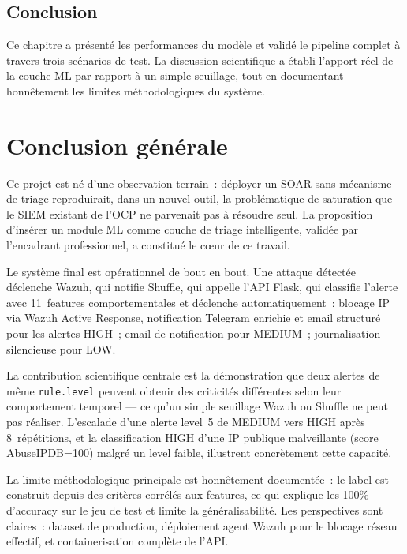 \documentclass[12pt,a4paper]{report}
\begin{document}
\section*{Conclusion}
Ce chapitre a présenté les performances du modèle et validé le
pipeline complet à travers trois scénarios de test. La discussion
scientifique a établi l'apport réel de la couche ML par rapport à
un simple seuillage, tout en documentant honnêtement les limites
méthodologiques du système.

\chapter*{Conclusion générale}

Ce projet est né d'une observation terrain~: déployer un SOAR sans mécanisme de triage reproduirait, dans un nouvel outil, la problématique de saturation que le SIEM existant de l'OCP ne parvenait pas à résoudre seul. La proposition d'insérer un module ML comme couche de triage intelligente, validée par l'encadrant professionnel, a constitué le cœur de ce travail.

Le système final est opérationnel de bout en bout. Une attaque détectée déclenche Wazuh, qui notifie Shuffle, qui appelle l'API Flask, qui classifie l'alerte avec 11~features comportementales et déclenche automatiquement~: blocage IP via Wazuh Active Response, notification Telegram enrichie et email structuré pour les alertes HIGH~; email de notification pour MEDIUM~; journalisation silencieuse pour LOW.

La contribution scientifique centrale est la démonstration que deux alertes de même \texttt{rule.level} peuvent obtenir des criticités différentes selon leur comportement temporel — ce qu'un simple seuillage Wazuh ou Shuffle ne peut pas réaliser. L'escalade d'une alerte level~5 de MEDIUM vers HIGH après 8~répétitions, et la classification HIGH d'une IP publique malveillante (score AbuseIPDB=100) malgré un level faible, illustrent concrètement cette capacité.

La limite méthodologique principale est honnêtement documentée~: le label est construit depuis des critères corrélés aux features, ce qui explique les 100\% d'accuracy sur le jeu de test et limite la généralisabilité. Les perspectives sont claires~: dataset de production, déploiement agent Wazuh pour le blocage réseau effectif, et containerisation complète de l'API.
\end{document}
